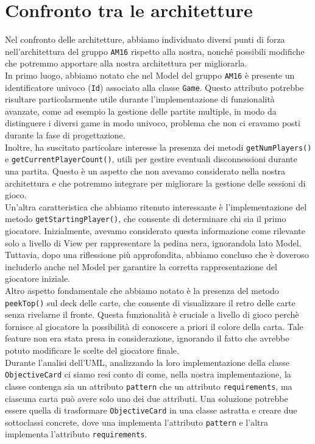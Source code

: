 \documentclass[12pt]{article}
\begin{document}
\section{Confronto tra le architetture}
%
%
Nel confronto delle architetture, abbiamo individuato diversi punti di forza nell'architettura del gruppo \texttt{AM16} rispetto alla nostra, nonché possibili modifiche che potremmo apportare alla nostra architettura per migliorarla.\\
In primo luogo, abbiamo notato che nel Model del gruppo \texttt{AM16} è presente un identificatore univoco (\texttt{Id}) associato alla classe \texttt{Game}. Questo attributo potrebbe risultare particolarmente utile durante l'implementazione di funzionalità avanzate, come ad esempio la gestione delle partite multiple, in modo da distinguere i diversi game in modo univoco, problema che non ci eravamo posti durante la fase di progettazione.\\
Inoltre, ha suscitato particolare interesse la presenza dei metodi \texttt{getNumPlayers()} e \texttt{getCurrentPlayerCount()}, utili per gestire eventuali disconnessioni durante una partita. Questo è un aspetto che non avevamo considerato nella nostra architettura e che potremmo integrare per migliorare la gestione delle sessioni di gioco.\\
Un'altra caratteristica che abbiamo ritenuto interessante è l'implementazione del metodo \texttt{getStartingPlayer()}, che consente di determinare chi sia il primo giocatore. Inizialmente, avevamo considerato questa informazione come rilevante solo a livello di View per rappresentare la pedina nera, ignorandola lato Model. Tuttavia, dopo una riflessione più approfondita, abbiamo concluso che è doveroso includerlo anche nel Model per garantire la corretta rappresentazione del giocatore iniziale.\\
Altro aspetto fondamentale che abbiamo notato è la presenza del metodo \texttt{peekTop()} sul deck delle carte, che consente di visualizzare il retro delle carte senza rivelarne il fronte. Questa funzionalità è cruciale a livello di gioco perchè fornisce al giocatore la possibilità di conoscere a priori il colore della carta. Tale feature non era stata presa in considerazione, ignorando il fatto che avrebbe potuto modificare le scelte del giocatore finale.\\
Durante l'analisi dell'UML, analizzando la loro implementazione della classe \texttt{ObjectiveCard} ci siamo resi conto di come, nella nostra implementazione, la classe contenga sia un attributo \texttt{pattern} che un attributo \texttt{requirements}, ma ciascuna carta può avere solo uno dei due attributi. Una soluzione potrebbe essere quella di trasformare \texttt{ObjectiveCard} in una classe astratta e creare due sottoclassi concrete, dove una implementa l'attributo \texttt{pattern} e l'altra implementa l'attributo \texttt{requirements}.\\
\end{document}
